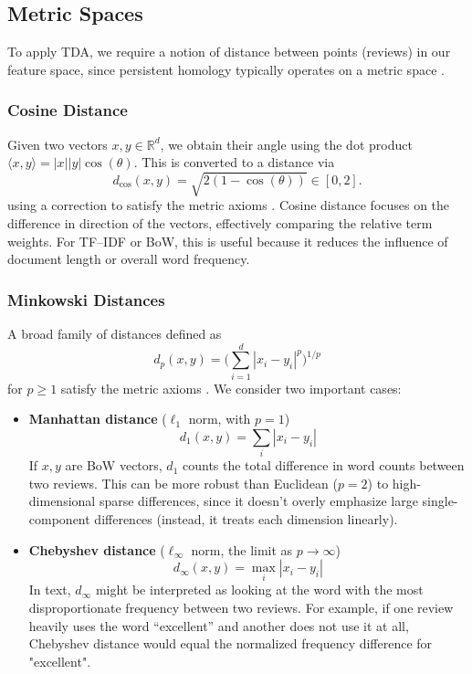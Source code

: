 \documentclass[fleqn,10pt]{SelfArx}
\begin{document}
\subsection{Metric Spaces}
To apply TDA, we require a notion of distance between points (reviews) in our feature space, since persistent homology typically operates on a metric space \cite{edelsbrunner2009computational}.
\subsubsection{Cosine Distance}
Given two vectors $x, y \in \mathbb{R}^d$, we obtain their angle using the dot product $\langle x, y\rangle  = |x||y|\cos(\theta).$
This is converted to a distance via 
$$d_{\cos}(x,y) = \sqrt{2\left(1 - \cos(\theta)\right)} \in [0,2].$$
using a correction to satisfy the metric axioms \cite{cossim}. Cosine distance focuses on the difference in direction of the vectors, effectively comparing the relative term weights. For TF–IDF or BoW, this is useful because it reduces the influence of document length or overall word frequency. 
\subsubsection{Minkowski Distances}
A broad family of distances defined as 
$$d_p(x,y) = \Big(\sum_{i=1}^d |x_i - y_i|^p \Big)^{1/p}$$
for $p\ge1$ satisfy the metric axioms \cite{viro2008elementary}. We consider two important cases:
\begin{itemize}
	\item \textbf{Manhattan distance} ($\ell_1$ norm, with $p=1$)
	$$d_{1}(x,y) = \sum_{i}|x_i - y_i|$$
	If $x,y$ are BoW vectors, $d_1$ counts the total difference in word counts between two reviews. This can be more robust than Euclidean ($p=2$) to high-dimensional sparse differences, since it doesn’t overly emphasize large single-component differences (instead, it treats each dimension linearly).
	\item \textbf{Chebyshev distance} ($\ell_{\infty}$ norm, the limit as $p \to \infty$)
	$$d_{\infty}(x,y) = \max_i |x_i - y_i|$$
	In text, $d_{\infty}$ might be interpreted as looking at the word with the most disproportionate frequency between two reviews. For example, if one review heavily uses the word “excellent” and another does not use it at all, Chebyshev distance would equal the normalized frequency difference for "excellent".
\end{itemize}
\end{document}
